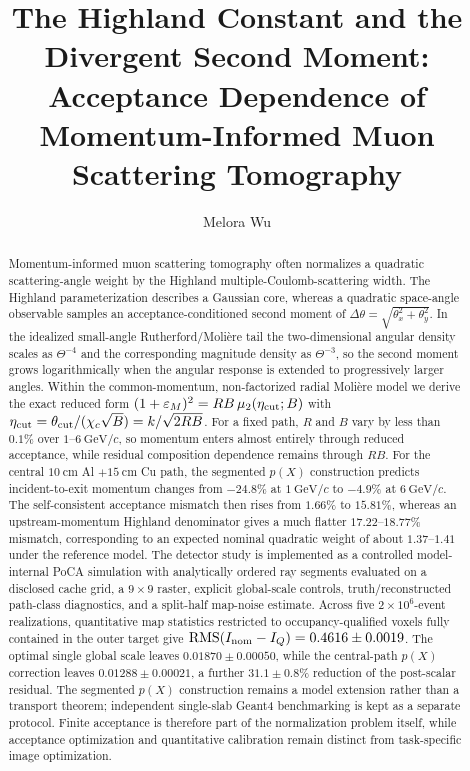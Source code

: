 \documentclass[aps,pra,reprint,longbibliography,floatfix]{revtex4-2}
\newcommand{\epsM}{\ensuremath{\varepsilon_M}}
\newcommand{\thetacut}{\ensuremath{\theta_{\mathrm{cut}}}}
\newcommand{\dtheta}{\ensuremath{\Delta\theta}}
\newcommand{\chic}{\ensuremath{\chi_c}}
\begin{document}
\title{The Highland Constant and the Divergent Second Moment:\\
Acceptance Dependence of Momentum-Informed Muon Scattering Tomography}
\author{Melora Wu}

\begin{abstract}
Momentum-informed muon scattering tomography often normalizes a quadratic scattering-angle weight by the Highland multiple-Coulomb-scattering width.  The Highland parameterization describes a Gaussian core, whereas a quadratic space-angle observable samples an acceptance-conditioned second moment of $\dtheta=\sqrt{\theta_x^2+\theta_y^2}$.  In the idealized small-angle Rutherford/Moli\`ere tail the two-dimensional angular density scales as $\Theta^{-4}$ and the corresponding magnitude density as $\Theta^{-3}$, so the second moment grows logarithmically when the angular response is extended to progressively larger angles.  Within the common-momentum, non-factorized radial Moli\`ere model we derive the exact reduced form $(1+\epsM)^2=RB\,\mu_2(\eta_{\rm cut};B)$ with $\eta_{\rm cut}=\thetacut/(\chic\sqrt{B})=k/\sqrt{2RB}$.  For a fixed path, $R$ and $B$ vary by less than $0.1\%$ over $1$--$6~\mathrm{GeV}/c$, so momentum enters almost entirely through reduced acceptance, while residual composition dependence remains through $RB$.  For the central $10~\mathrm{cm}$ Al $+15~\mathrm{cm}$ Cu path, the segmented $p(X)$ construction predicts incident-to-exit momentum changes from $-24.8\%$ at $1~\mathrm{GeV}/c$ to $-4.9\%$ at $6~\mathrm{GeV}/c$.  The self-consistent acceptance mismatch then rises from $1.66\%$ to $15.81\%$, whereas an upstream-momentum Highland denominator gives a much flatter $17.22$--$18.77\%$ mismatch, corresponding to an expected nominal quadratic weight of about $1.37$--$1.41$ under the reference model.  The detector study is implemented as a controlled model-internal PoCA simulation with analytically ordered ray segments evaluated on a disclosed cache grid, a $9\times9$ raster, explicit global-scale controls, truth/reconstructed path-class diagnostics, and a split-half map-noise estimate.  Across five $2\times10^6$-event realizations, quantitative map statistics restricted to occupancy-qualified voxels fully contained in the outer target give $\operatorname{RMS}(I_{\rm nom}-I_Q)=0.4616\pm0.0019$.  The optimal single global scale leaves $0.01870\pm0.00050$, while the central-path $p(X)$ correction leaves $0.01288\pm0.00021$, a further $31.1\pm0.8\%$ reduction of the post-scalar residual.  The segmented $p(X)$ construction remains a model extension rather than a transport theorem; independent single-slab Geant4 benchmarking is kept as a separate protocol.  Finite acceptance is therefore part of the normalization problem itself, while acceptance optimization and quantitative calibration remain distinct from task-specific image optimization.
\end{abstract}
\end{document}
